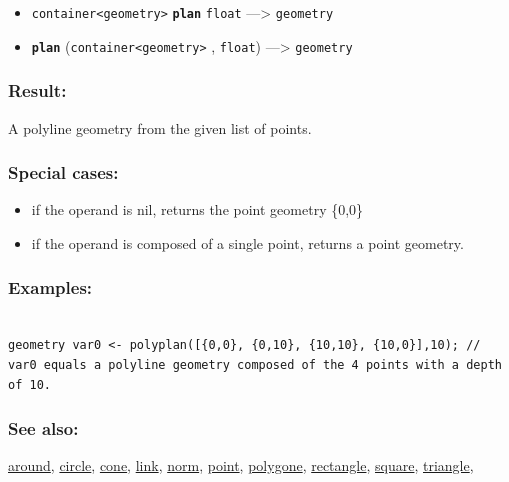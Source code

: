 \documentclass[]{book}
\providecommand{\tightlist}{%
  \setlength{\itemsep}{0pt}\setlength{\parskip}{0pt}}
\theoremstyle{definition}
\theoremstyle{definition}
\theoremstyle{definition}
\theoremstyle{remark}
\begin{document}
\begin{itemize}
\tightlist
\item
  \texttt{container\textless{}geometry\textgreater{}}
  \textbf{\texttt{plan}} \texttt{float} ---\textgreater{}
  \texttt{geometry}
\item
  \textbf{\texttt{plan}}
  (\texttt{container\textless{}geometry\textgreater{}} , \texttt{float})
  ---\textgreater{} \texttt{geometry}
\end{itemize}

\subsubsection{Result:}\label{result-386}

A polyline geometry from the given list of points.

\subsubsection{Special cases:}\label{special-cases-110}

\begin{itemize}
\tightlist
\item
  if the operand is nil, returns the point geometry \{0,0\}\\
\item
  if the operand is composed of a single point, returns a point
  geometry.
\end{itemize}

\subsubsection{Examples:}\label{examples-275}

\begin{verbatim}
 
geometry var0 <- polyplan([{0,0}, {0,10}, {10,10}, {10,0}],10); // var0 equals a polyline geometry composed of the 4 points with a depth of 10.
\end{verbatim}

\subsubsection{See also:}\label{see-also-161}

\href{operators-a-to-a.html\#around}{around},
\href{operators-b-to-c.html\#circle}{circle},
\href{operators-b-to-c.html\#cone}{cone},
\href{operators-i-to-m.html\#link}{link},
\href{operators-n-to-r.html\#norm}{norm},
\href{operators-n-to-r.html\#point}{point},
\href{operators-s-to-z.html\#polygone}{polygone},
\href{operators-n-to-r.html\#rectangle}{rectangle},
\href{operators-s-to-z.html\#square}{square},
\href{operators-s-to-z.html\#triangle}{triangle},
\end{document}
